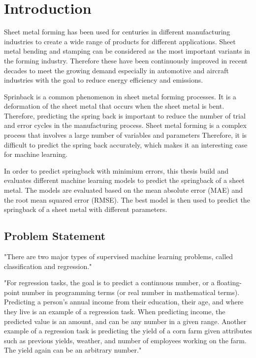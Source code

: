 \chapter{Introduction}

Sheet metal forming has been used for centuries in different manufacturing industries to create a wide range of products for different applications. 
Sheet metal bending and stamping can be considered as the most important variants in the forming industry. \cite[p. 1]{cruz_applicationmachinelearning_2021} 
Therefore these have been continuously improved in recent decades to meet the growing demand especially in  automotive and aircraft industries with the goal to reduce energy efficiency and emissions. \cite[p. 4]{zheng_reviewformingtechniques_2018}

Sprinback is a common phenomenon in sheet metal forming processes. It is a deformation of the sheet metal that occurs when the sheet metal is bent. Therefore, predicting the spring back is important to reduce the number of trial and error cycles in the manufacturing process. \cite[p. 1]{cruz_applicationmachinelearning_2021} 
Sheet metal forming is a complex process that involves a large number of variables and parameters Therefore, it is difficult to predict the spring back accurately, which makes it an interesting case for machine learning.

In order to predict springback with minimium errors, this thesis build and evaluates different machine learning models to predict the springback of a sheet metal. The models are evaluated based on the mean absolute error (MAE) and the root mean squared error (RMSE). The best model is then used to predict the springback of a sheet metal with different parameters. 

\section{Problem Statement}
"There are two major types of supervised machine learning problems,
called classification and regression." \cite[p. 34]{muller_introductionmachine_2016}

"For regression tasks, the goal is to predict a continuous number, or a
floating-point number in programming terms (or real number in
mathematical terms). Predicting a person’s annual income from their
education, their age, and where they live is an example of a regression
task. When predicting income, the predicted value is an amount, and
can be any number in a given range. Another example of a regression task
is predicting the yield of a corn farm given attributes such as
previous yields, weather, and number of employees working on the farm.
The yield again can be an arbitrary number." \cite[p. 34]{muller_introductionmachinelearning_2016}